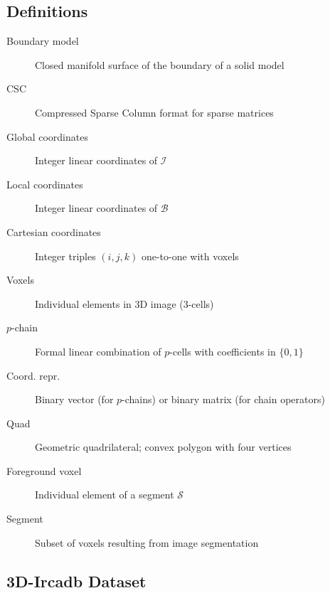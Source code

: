 \documentclass[11pt, oneside]{amsart}   	%
\begin{document}
\subsection{Definitions}
\begin{description}

\item[Boundary model] Closed manifold surface of the boundary of a solid model
\item[CSC]  Compressed Sparse Column format for sparse matrices
\item[Global coordinates]  Integer linear coordinates of $\mathcal{I}$
\item[Local coordinates] Integer linear coordinates of $\mathcal{B}$
\item[Cartesian coordinates] Integer triples $(i,j,k)$ one-to-one with voxels
\item[Voxels] Individual elements in 3D image (3-cells)
\item[$p$-chain] Formal linear combination of $p$-cells with coefficients in $\{0,1\}$
\item[Coord. repr.]  Binary vector (for $p$-chains) or binary matrix (for chain operators)
\item[Quad]	Geometric quadrilateral; convex polygon with four vertices
\item[Foreground voxel] Individual element of a segment $\mathcal{S}$
\item[Segment]	Subset of voxels resulting from image segmentation
\end{description}

\subsection{3D-Ircadb Dataset}

\begin{table}

\label{tab:ircad1}
\end{table}

\begin{table}

\label{tab:ircad2}
\end{table}

\clearpage{}


\end{document}
